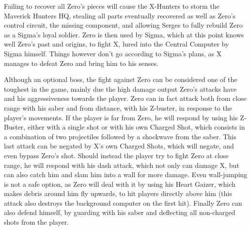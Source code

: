 Failing to recover all Zero's pieces will cause the X-Hunters to storm the Maverick Hunters HQ, stealing all parts eventually recovered as well as Zero's control circuit, the missing component, and allowing Serges to fully rebuild Zero as a Sigma's loyal soldier. Zero is then used by Sigma, which at this point knows well Zero's past and origins, to fight X, lured into the Central Computer by Sigma himself. Things however  don't go according to Sigma's plans, as X manages to defeat Zero and bring him to his senses.

Although an optional boss, the fight against Zero can be considered one of the toughest in the game, mainly due the high damage output Zero's attacks have and his aggressiveness towards the player. Zero can in fact attack both from close range with his saber and from distance, with his Z-buster, in response to the player's movements. If the player is far from Zero, he will respond by using his Z-Buster, either with a single shot or with his own Charged Shot, which consists in a combination of two projectiles followed by a shockwave from the saber. This last attack can be negated by X's own Charged Shots, which will negate, and even bypass Zero's shot. Should instead the player try to fight Zero at close range, he will respond with his dash attack, which not only can damage X, but can also catch him and slam him into a wall for more damage. Even wall-jumping is not a safe option, as Zero will deal with it by using his Heart Gaizer, which makes debris around him fly upwards, to hit players directly above him (this attack also destroys the background computer on the first hit). Finally Zero can also defend himself, by guarding with his saber and deflecting all non-charged shots from the player.

